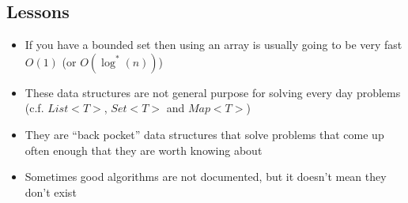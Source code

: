 
\begin{slide}
\section{Lessons}

\begin{PauseHighLight}
  \begin{itemize}
  \item If you have a bounded set then using an array is usually going
    to be very fast $O(1)$ (or $O(\log^*(n))$)\pause
  \item These data structures are not general purpose for solving every
    day problems (c.f. \jl$List<T>$, \jl$Set<T>$ and \jl$Map<T>$)\pause
  \item They are ``back pocket'' data structures that solve problems
    that come up often enough that they are worth knowing about\pause
  \item Sometimes good algorithms are not documented, but it doesn't
    mean they don't exist\pause
  \end{itemize}
\end{PauseHighLight}

\end{slide}
